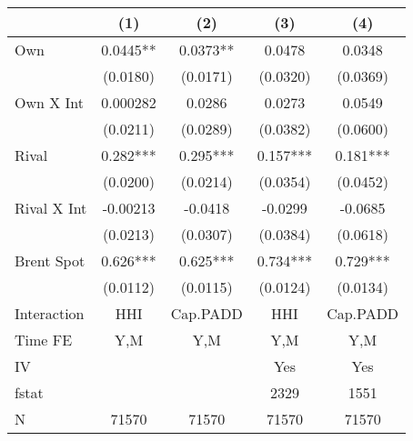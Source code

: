 {
\def\sym#1{\ifmmode^{#1}\else\(^{#1}\)\fi}
\begin{tabular}{l*{4}{c}}
\toprule
                &\multicolumn{1}{c}{(1)}   &\multicolumn{1}{c}{(2)}   &\multicolumn{1}{c}{(3)}   &\multicolumn{1}{c}{(4)}   \\
\midrule
Own             &   0.0445** &   0.0373** &   0.0478   &   0.0348   \\
                & (0.0180)   & (0.0171)   & (0.0320)   & (0.0369)   \\
\addlinespace
Own X Int       & 0.000282   &   0.0286   &   0.0273   &   0.0549   \\
                & (0.0211)   & (0.0289)   & (0.0382)   & (0.0600)   \\
\addlinespace
Rival           &    0.282***&    0.295***&    0.157***&    0.181***\\
                & (0.0200)   & (0.0214)   & (0.0354)   & (0.0452)   \\
\addlinespace
Rival X Int     & -0.00213   &  -0.0418   &  -0.0299   &  -0.0685   \\
                & (0.0213)   & (0.0307)   & (0.0384)   & (0.0618)   \\
\addlinespace
Brent Spot      &    0.626***&    0.625***&    0.734***&    0.729***\\
                & (0.0112)   & (0.0115)   & (0.0124)   & (0.0134)   \\
\midrule
Interaction     &      HHI   & Cap.PADD   &      HHI   & Cap.PADD   \\
Time FE         &      Y,M   &      Y,M   &      Y,M   &      Y,M   \\
IV              &            &            &      Yes   &      Yes   \\
fstat           &            &            &     2329   &     1551   \\
N               &    71570   &    71570   &    71570   &    71570   \\
\bottomrule
\end{tabular}
}
